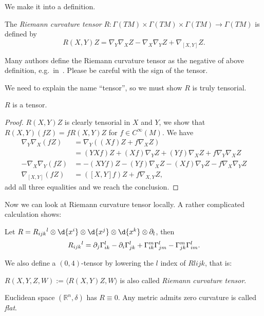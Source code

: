 We make it into a definition.

\begin{defn}
    The \emph{Riemann curvature tensor} $R:\Gamma(TM)\times\Gamma(TM)\times\Gamma(TM)\to\Gamma(TM)$ is defined by
    \[R(X,Y)Z=\nabla_Y\nabla_XZ-\nabla_X\nabla_YZ+\nabla_{[X,Y]}Z.\]
\end{defn}

\begin{rem}
    Many authors define the Riemann curvature tensor as the negative of above definition, e.g.\ in~\cite{Petersen}.
    Please be careful with the sign of the tensor.
\end{rem}

We need to explain the name ``tensor'', so we must show $R$ is truly tensorial.
\begin{lem}\label{R tensor}
    $R$ is a tensor.
\end{lem}
\begin{proof}
    $R(X,Y)Z$ is clearly tensorial in $X$ and $Y$, we show that $R(X,Y)(fZ)=fR(X,Y)Z$ for $f\in C^\infty(M)$.
    We have
    \begin{align*}
        \nabla_Y\nabla_X(fZ)&=\nabla_Y((Xf)Z+f\nabla_XZ)\\
        &=(YXf)Z+(Xf)\nabla_YZ+(Yf)\nabla_XZ+f\nabla_Y\nabla_XZ\\
        -\nabla_X\nabla_Y(fZ)&=-(XYf)Z-(Yf)\nabla_XZ-(Xf)\nabla_YZ-f\nabla_X\nabla_YZ\\
        \nabla_{[X,Y]}(fZ)&=([X,Y]f)Z+f\nabla_{{X,Y}}Z,
    \end{align*}
    add all three equalities and we reach the conclusion.
\end{proof}

Now we can look at Riemann curvature tensor locally.
A rather complicated calculation shows:
\begin{lem}
    Let $R=\R{l}{i}{j}{k}\otimes\d{x^i}\otimes\d{x^j}\otimes\d{x^k}\otimes\partial_l$, then
    \[\R{l}{i}{j}{k}=\partial_j\Gamma^l_{ik}-\partial_i\Gamma^l_{jk}+\Gamma^m_{ik}\Gamma^l_{jm}-\Gamma^m_{jk}\Gamma^l_{im}.\]
\end{lem}

We also define a $(0,4)$-tensor by lowering the $l$ index of $R{l}{i}{j}{k}$, that is:
\begin{defn}
    $R(X,Y,Z,W):=\langle R(X,Y)Z,W\rangle$ is also called \emph{Riemann curvature tensor}.
\end{defn}

\begin{eg}
    Euclidean space $(\mathbb{R}^n,\delta)$ has $R\equiv 0$.
    Any metric admits zero curvature is called \emph{flat}.
\end{eg}

